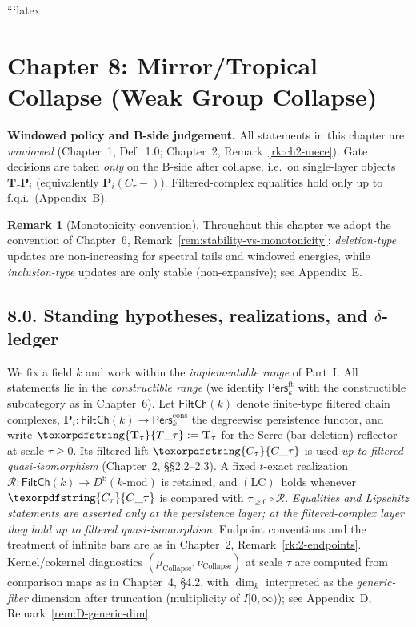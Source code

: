 \documentclass[11pt]{article}
\DeclareRobustCommand{\hyp}{\nobreakdash-}
\newcommand{\Pers}{\mathsf{Pers}}
\newcommand{\Rfun}{\mathcal{R}}
\numberwithin{equation}{section}
\theoremstyle{definition}
\newtheorem{remark}[theorem]{Remark}
\DeclareRobustCommand{\FiltCh}[1]{\mathsf{FiltCh}(#1)}
\DeclareRobustCommand{\Ttau}{\texorpdfstring{\ensuremath{\mathbf{T}_{\tau}}}{T\_\tau}}
\DeclareRobustCommand{\Ctau}{\texorpdfstring{\ensuremath{C_{\tau}}}{C\_\tau}}
\DeclareRobustCommand{\LC}{\texorpdfstring{\ensuremath{\mathrm{(LC)}}}{(LC)}}
\begin{document}
```latex
\section{Chapter 8: Mirror/Tropical Collapse (Weak Group Collapse)}

\noindent\textbf{Windowed policy and B-side judgement.}
All statements in this chapter are \emph{windowed} (Chapter~1, Def.~1.0; Chapter~2, Remark~\ref{rk:ch2-mece}).
Gate decisions are taken \emph{only} on the B-side after collapse, i.e.\ on single-layer objects
$\mathbf{T}_\tau\mathbf{P}_i$ (equivalently $\mathbf{P}_i(C_\tau-)$).
Filtered-complex equalities hold only up to f.q.i.\ (Appendix~B).

\begin{remark}[Monotonicity convention]
Throughout this chapter we adopt the convention of
Chapter~6, Remark~\ref{rem:stability-vs-monotonicity}:
\emph{deletion\hyp type} updates are non\hyp increasing for spectral tails and windowed energies,
while \emph{inclusion\hyp type} updates are only stable (non\hyp expansive); see Appendix~E.
\end{remark}

\subsection*{8.0. Standing hypotheses, realizations, and $\delta$-ledger}
We fix a field \(k\) and work within the \emph{implementable range} of Part~I.
All statements lie in the \emph{constructible range} (we identify \(\Pers^{\mathrm{ft}}_k\) with the constructible subcategory as in Chapter~6).
Let \(\FiltCh{k}\) denote finite\hyp type filtered chain complexes,
\(\mathbf{P}_i:\FiltCh{k}\to\Pers^{\mathrm{cons}}_k\) the degreewise persistence functor, and write
\(\Ttau:=\mathbf{T}_\tau\) for the Serre (bar\hyp deletion) reflector at scale \(\tau\ge 0\).
Its filtered lift \(\Ctau\) is used \emph{up to filtered quasi\hyp isomorphism} (Chapter~2, §§2.2–2.3).
A fixed \(t\)\hyp exact realization \(\Rfun:\FiltCh{k}\to D^{\mathrm{b}}(k\text{-mod})\) is retained, and \LC\ holds whenever \(\Ctau\) is compared with \(\tau_{\ge 0}\!\circ\!\Rfun\).
\emph{Equalities and Lipschitz statements are asserted only at the persistence layer; at the filtered\hyp complex layer they hold up to filtered quasi\hyp isomorphism.}
Endpoint conventions and the treatment of infinite bars are as in Chapter~2, Remark~\ref{rk:2-endpoints}.
Kernel/cokernel diagnostics \((\mu_{\mathrm{Collapse}},\nu_{\mathrm{Collapse}})\) at scale \(\tau\) are computed from comparison maps as in Chapter~4, §4.2, with \(\dim_k\) interpreted as the \emph{generic\hyp fiber} dimension after truncation (multiplicity of \(I[0,\infty)\)); see Appendix~D, Remark~\ref{rem:D-generic-dim}.
\end{document}
